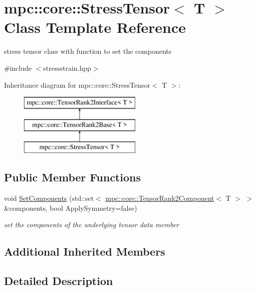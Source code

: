 \hypertarget{structmpc_1_1core_1_1_stress_tensor}{}\section{mpc\+:\+:core\+:\+:Stress\+Tensor$<$ T $>$ Class Template Reference}
\label{structmpc_1_1core_1_1_stress_tensor}


stress tensor class with function to set the components  




{\ttfamily \#include $<$stressstrain.\+hpp$>$}

Inheritance diagram for mpc\+:\+:core\+:\+:Stress\+Tensor$<$ T $>$\+:\begin{figure}[H]
\begin{center}
\leavevmode
\includegraphics[height=3.000000cm]{structmpc_1_1core_1_1_stress_tensor}
\end{center}
\end{figure}
\subsection*{Public Member Functions}
\begin{DoxyCompactItemize}
\item 
void \mbox{\hyperlink{structmpc_1_1core_1_1_stress_tensor_afbac9aaa45907cdbed3ed779b0551bad}{Set\+Components}} (std\+::set$<$ \mbox{\hyperlink{namespacempc_1_1core_a467e1fa517a8c269b033fef3aa281360}{mpc\+::core\+::\+Tensor\+Rank2\+Component}}$<$ T $>$ $>$ \&components, bool Apply\+Symmetry=false)
\begin{DoxyCompactList}\small\item\em set the components of the underlying tensor data member \end{DoxyCompactList}\end{DoxyCompactItemize}
\subsection*{Additional Inherited Members}


\subsection{Detailed Description}
